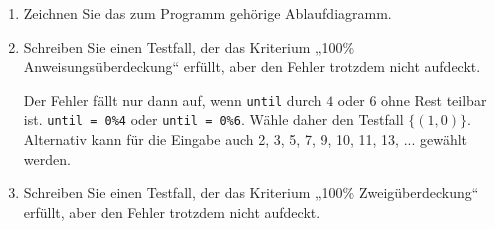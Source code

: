 \documentclass{lehramt-informatik-minimal}
\begin{document}
\begin{enumerate}



\item Zeichnen Sie das zum Programm gehörige Ablaufdiagramm.

\begin{antwort}
\end{antwort}


\item Schreiben Sie einen Testfall, der das Kriterium „100\%
Anweisungsüberdeckung“ erfüllt, aber den Fehler trotzdem nicht aufdeckt.

\begin{antwort}
Der Fehler fällt nur dann auf, wenn \texttt{until} durch $4$ oder $6$
ohne Rest teilbar ist. \texttt{until = 0\%4} oder \texttt{until = 0\%6}.
Wähle daher den Testfall $\{(1, 0)\}$. Alternativ kann für die Eingabe
auch 2, 3, 5, 7, 9, 10, 11, 13, ... gewählt werden.
\end{antwort}


\item Schreiben Sie einen Testfall, der das Kriterium „100\%
Zweigüberdeckung“ erfüllt, aber den Fehler trotzdem nicht aufdeckt.


\end{enumerate}
\end{document}
